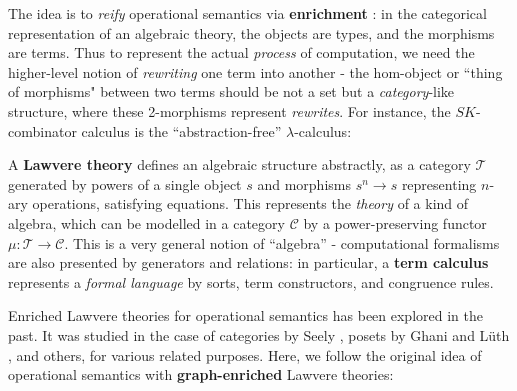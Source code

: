 \documentclass[a4paper,UKenglish]{article}
\theoremstyle{definition}
\newcommand{\C}{\mathscr{C}}
\newcommand{\T}{\mathscr{T}}
\begin{document}
The idea is to \textit{reify} operational semantics via \textbf{enrichment} \cite{enrich}: in the categorical representation of an algebraic theory, the objects are types, and the morphisms are terms. Thus to represent the actual \textit{process} of computation, we need the higher-level notion of \textit{rewriting} one term into another - the hom-object or ``thing of morphisms" between two terms should be not a set but a \textit{category}-like structure, where these 2-morphisms represent \textit{rewrites}. For instance, the $SK$-combinator calculus is the ``abstraction-free'' $\lambda$-calculus:

\begin{center}
	\begin{minipage}{.2 \textwidth}
	\end{minipage}\qquad \qquad
	\begin{minipage}{.2 \textwidth}
	\end{minipage}
\end{center}

A \textbf{Lawvere theory} \cite{lawvere} defines an algebraic structure abstractly, as a category $\T$ generated by powers of a single object $s$ and morphisms $s^n \to s$ representing $n$-ary operations, satisfying equations. This represents the \textit{theory} of a kind of algebra, which can be modelled in a category $\C$ by a power-preserving functor $\mu:\T \to \C$. This is a very general notion of ``algebra'' - computational formalisms are also presented by generators and relations: in particular, a \textbf{term calculus} represents a \textit{formal language} by sorts, term constructors, and congruence rules.

Enriched Lawvere theories for operational semantics has been explored in the past. It was studied in the case of categories by Seely \cite{seely}, posets by Ghani and L\"uth \cite{ghani}, and others, for various related purposes. Here, we follow the original idea of operational semantics with \textbf{graph-enriched} Lawvere theories:
\end{document}
